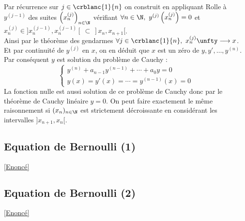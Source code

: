 \documentclass{book}
\begin{document}
	Par récurrence sur $j\in \crblanc{1}{n}$ on construit en appliquant Rolle à $y^{(j-1)}$ des suites $\left(x_n^{(j)}\right)_{n\in \N}$ vérifiant $\forall n\in \N,\ y^{(j)}\left(x_n^{(j)}\right)=0$ et $x_n^{(j)}\in ]x_n^{(j-1)},x_n^{(j-1)}[\ \subset\ ]x_n,x_{n+1}[$.\\
	Ainsi par le théorème des gendarmes $\forall j\in \crblanc{1}{n},\ x_n^{(j)}\unfty\longrightarrow x$. Et par continuité de $y^{(j)}$ en $x$, on en déduit que $x$ est un zéro de $y,y',\dots,y^{(n)}$. Par conséquent $y$ est solution du problème de Cauchy :
	$$\begin{cases}
		y^{(n)}+a_{n-1}y^{(n-1)}+\cdots+a_0y=0\\
		y(x)=y'(x)=\cdots=y^{(n-1)}(x)=0
	\end{cases}$$
	La fonction nulle est aussi solution de ce problème de Cauchy donc par le théorème de Cauchy linéaire $y=0$. On peut faire exactement le même raisonnement si $(x_n)_{n\in \N}$ est strictement décroissante en considérant les intervalles $]x_{n+1},x_n[$.
	
	\subsection{Equation de Bernoulli (1)}
	\label{sec:equation-de-bernoulli-1}
	\textcolor{blue}{\hyperref[Equation de Bernoulli 1]{[Enoncé]}}\\
	
	\subsection{Equation de Bernoulli (2)}
	\label{sec:equation-de-bernoulli-2}
	\textcolor{blue}{\hyperref[Equation de Bernoulli (2)]{[Enoncé]}}\\
	
\end{document}
